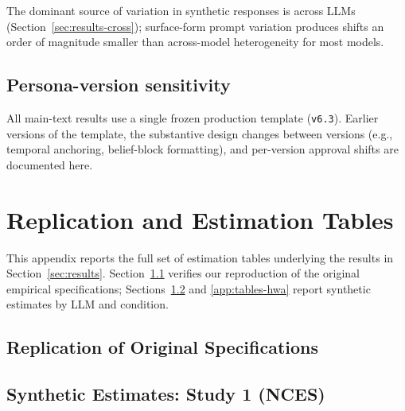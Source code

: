 \documentclass[12pt]{article}
\begin{document}
\label{tab:prompt-sensitivity}

The dominant source of variation in synthetic responses is across LLMs (Section~\ref{sec:results-cross}); surface-form prompt variation produces shifts an order of magnitude smaller than across-model heterogeneity for most models.

\subsection{Persona-version sensitivity}

All main-text results use a single frozen production template (\texttt{v6.3}). Earlier versions of the template, the substantive design changes between versions (e.g., temporal anchoring, belief-block formatting), and per-version approval shifts are documented here.

\label{tab:persona-version}

\section{Replication and Estimation Tables}\label{app:tables}

This appendix reports the full set of estimation tables underlying the
results in Section~\ref{sec:results}. Section~\ref{app:replication}
verifies our reproduction of the original empirical specifications;
Sections~\ref{app:tables-nces} and \ref{app:tables-hwa} report synthetic
estimates by LLM and condition.

\subsection{Replication of Original Specifications}\label{app:replication}

\label{tab:repl-logit-Study1}

\label{tab:repl-clogit-Study2}

\newpage
\subsection{Synthetic Estimates: Study 1 (NCES)}\label{app:tables-nces}
\end{document}
